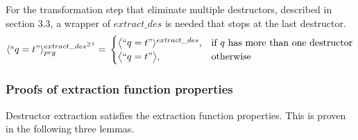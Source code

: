 For the transformation step that eliminate multiple destructors, described in section 3.3, a wrapper of $extract\_des$ is needed that stops at the last destructor.
\[
    \langle `` q = t " \rangle^{extract\_des^{\geq 1}}_{prg} =\\
\begin{cases}
    \big\langle `` q = t " \rangle^{extract\_des},& \text{if $q$ has more than one destructor} \\
   \big\langle `` q = t " \big\rangle,& \text{otherwise}
\end{cases}
\]

\subsubsection{Proofs of extraction function properties}

Destructor extraction satisfies the extraction function properties. This is proven in the following three lemmas.

